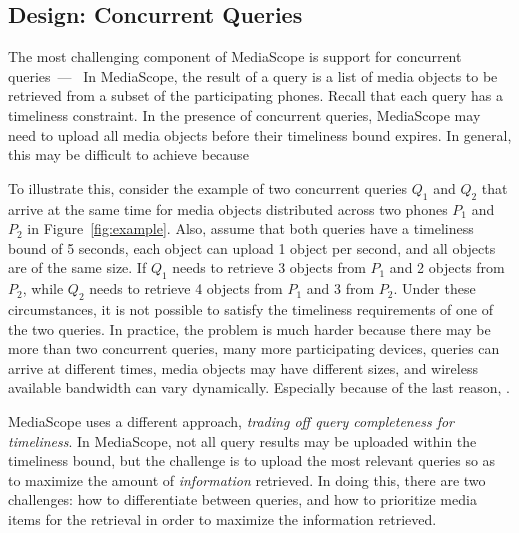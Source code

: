 
\subsection{Design: Concurrent Queries}
\label{sec-3-2}

The most challenging component of MediaScope is support for concurrent
queries~---~
%
In MediaScope, the result of a query is a list of media objects to be
retrieved from a subset of the participating phones.
%
Recall that each query has a timeliness constraint.
%
In the presence of concurrent queries, MediaScope may need to upload
all media objects before their timeliness bound expires.
%
In general, this may be difficult to achieve because 

To illustrate this, consider the example of two concurrent queries
$Q_1$ and $Q_2$ that arrive at the same time for media objects
distributed across two phones $P_1$ and $P_2$ in Figure~\ref{fig:example}.
%
Also, assume that both queries have a timeliness bound of 5 seconds,
each object can upload 1 object per second, and all objects are of the
same size.
%
If $Q_1$ needs to retrieve 3 objects from $P_1$ and 2 objects from
$P_2$, while $Q_2$ needs to retrieve 4 objects from $P_1$ and 3 from
$P_2$.
%
Under these circumstances, it is not possible to satisfy the
timeliness requirements of
one of the two queries.
%
In practice, the problem is much harder because there may be more than
two concurrent queries, many more participating devices, queries can
arrive at different times, media objects may have different sizes, and
wireless available bandwidth can vary dynamically.
%
Especially because of the last reason, .

MediaScope uses a different approach, \emph{trading off query
  completeness for timeliness}.
%
In MediaScope, not all query results may be uploaded within the
timeliness bound, but the challenge is to upload the most relevant
queries so as to maximize the amount of \emph{information} retrieved.
%
In doing this, there are two challenges: how to differentiate between
queries, and how to prioritize media items for the retrieval in order
to maximize the information retrieved.

